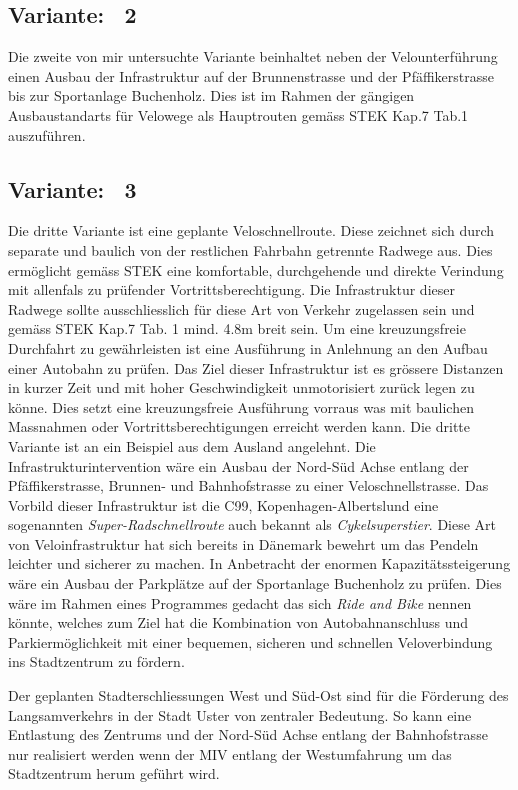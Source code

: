 \subsection{Variante: \ 2}
\label{chap:V2}
	
Die zweite von mir untersuchte Variante beinhaltet neben der Velounterführung einen Ausbau der Infrastruktur auf der Brunnenstrasse und der Pfäffikerstrasse bis zur Sportanlage Buchenholz. Dies ist im Rahmen der gängigen Ausbaustandarts für Velowege als Hauptrouten gemäss STEK Kap.7 Tab.1 auszuführen.

\subsection{Variante: \ 3}
\label{chap:V3}

Die dritte Variante ist eine geplante Veloschnellroute. 
Diese zeichnet sich durch separate und baulich von der restlichen Fahrbahn getrennte Radwege aus. Dies ermöglicht gemäss STEK eine komfortable, durchgehende und direkte Verindung mit allenfals zu prüfender Vortrittsberechtigung. Die Infrastruktur dieser Radwege sollte ausschliesslich für diese Art von Verkehr zugelassen sein und gemäss STEK Kap.7 Tab. 1 mind. 4.8m breit sein. Um eine kreuzungsfreie Durchfahrt zu gewährleisten ist eine Ausführung in Anlehnung an den Aufbau einer Autobahn zu prüfen.  
Das Ziel dieser Infrastruktur ist es grössere Distanzen in kurzer Zeit und mit hoher Geschwindigkeit unmotorisiert zurück legen zu könne. Dies setzt eine kreuzungsfreie Ausführung vorraus was mit baulichen Massnahmen oder Vortrittsberechtigungen erreicht werden kann.
Die dritte Variante ist an ein Beispiel aus dem Ausland angelehnt. Die Infrastrukturintervention wäre ein Ausbau der Nord-Süd Achse entlang der Pfäffikerstrasse, Brunnen- und Bahnhofstrasse zu einer Veloschnellstrasse. 
Das Vorbild dieser Infrastruktur ist die C99, Kopenhagen-Albertslund eine sogenannten \textit{Super-Radschnellroute} auch bekannt als \textit{Cykelsuperstier}. Diese Art von Veloinfrastruktur hat sich bereits in Dänemark bewehrt um das Pendeln leichter und sicherer zu machen. 
In Anbetracht der enormen Kapazitätssteigerung wäre ein Ausbau der Parkplätze auf der Sportanlage Buchenholz zu prüfen. Dies wäre im Rahmen eines Programmes gedacht das sich \textit{Ride and Bike} nennen könnte, welches zum Ziel hat die Kombination von Autobahnanschluss und Parkiermöglichkeit mit einer bequemen, sicheren und schnellen Veloverbindung ins Stadtzentrum zu fördern. 

Der geplanten Stadterschliessungen West und Süd-Ost sind für die Förderung des Langsamverkehrs in der Stadt Uster von zentraler Bedeutung. So kann eine Entlastung des Zentrums und der Nord-Süd Achse entlang der Bahnhofstrasse nur realisiert werden wenn der MIV entlang der Westumfahrung um das Stadtzentrum herum geführt wird. 





%


